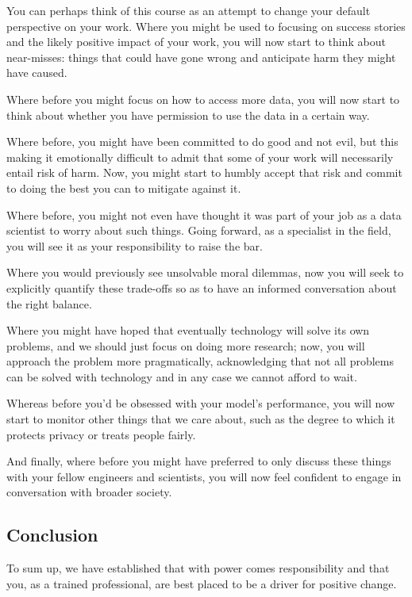 \documentclass[
]{book}
\theoremstyle{definition}
\theoremstyle{definition}
\theoremstyle{definition}
\theoremstyle{definition}
\theoremstyle{remark}
\begin{document}
You can perhaps think of this course as an attempt to change your default perspective on your work. Where you might be used to focusing on success stories and the likely positive impact of your work, you will now start to think about near-misses: things that could have gone wrong and anticipate harm they might have caused.

Where before you might focus on how to access more data, you will now start to think about whether you have permission to use the data in a certain way.

Where before, you might have been committed to do good and not evil, but this making it emotionally difficult to admit that some of your work will necessarily entail risk of harm. Now, you might start to humbly accept that risk and commit to doing the best you can to mitigate against it.

Where before, you might not even have thought it was part of your job as a data scientist to worry about such things. Going forward, as a specialist in the field, you will see it as your responsibility to raise the bar.

Where you would previously see unsolvable moral dilemmas, now you will seek to explicitly quantify these trade-offs so as to have an informed conversation about the right balance.

Where you might have hoped that eventually technology will solve its own problems, and we should just focus on doing more research; now, you will approach the problem more pragmatically, acknowledging that not all problems can be solved with technology and in any case we cannot afford to wait.

Whereas before you'd be obsessed with your model's performance, you will now start to monitor other things that we care about, such as the degree to which it protects privacy or treats people fairly.

And finally, where before you might have preferred to only discuss these things with your fellow engineers and scientists, you will now feel confident to engage
in conversation with broader society.

\hypertarget{conclusion}{%
\subsection{Conclusion}\label{conclusion}}

To sum up, we have established that with power comes responsibility and that you, as a trained professional, are best placed to be a driver for positive change.
\end{document}
